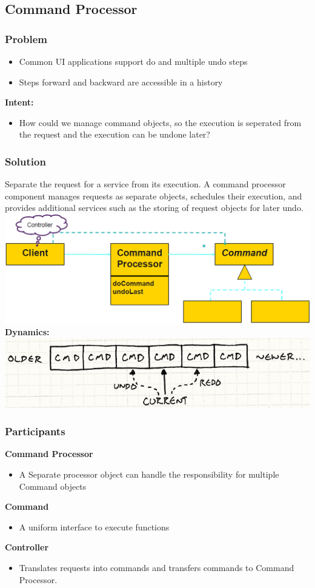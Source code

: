 \subsection{Command Processor}
\subsubsection{Problem}
\begin{itemize}
    \item Common UI applications support do and multiple undo steps
    \item Steps forward and backward are accessible in a history
\end{itemize}
\textbf{Intent:}
\begin{itemize}
    \item How could we manage command objects, so the execution is seperated from the request and the execution can be undone later?
\end{itemize}
\subsubsection{Solution}
Separate the request for a service from its execution. A command processor component manages requests as separate objects, schedules their execution, and provides additional services such as the storing of request objects for later undo.\\ 
\includegraphics[width=0.8\linewidth]{./img/command_processor.png}
\textbf{Dynamics:}\\ 
\includegraphics[width=\linewidth]{./img/command_processor_dynamic.png}
\subsubsection{Participants}
\textbf{Command Processor}
\begin{itemize}
    \item A Separate processor object can handle the responsibility for multiple Command objects
\end{itemize}
\textbf{Command}
\begin{itemize}
    \item A uniform interface to execute functions
\end{itemize}
\textbf{Controller}
\begin{itemize}
    \item Translates requests into commands and transfers commands to Command Processor.
\end{itemize}
